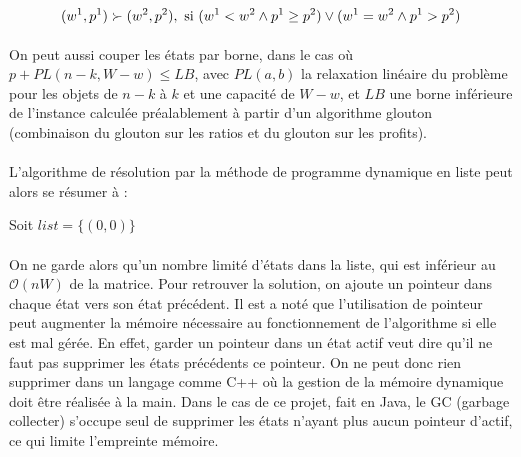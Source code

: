 \documentclass[12pt]{article}
\begin{document}
\[
(w^1,p^1)\succ(w^2,p^2), \textnormal{ si }
(w^1 < w^2 \wedge p^1 \geq p^2) \vee (w^1 = w^2 \wedge p^1 > p^2)
\]


\paragraph{}On peut aussi couper les états par borne, dans le cas où $p+PL(n-k,W-w) \leq LB$, avec $PL(a,b)$ la relaxation linéaire du problème pour les objets de $n-k$ à $k$ et une capacité de $W-w$, et $LB$ une borne inférieure de l'instance calculée préalablement à partir d'un algorithme glouton (combinaison du glouton sur les ratios et du glouton sur les profits).

\paragraph{}L'algorithme de résolution par la méthode de programme dynamique en liste peut alors se résumer à :

\begin{algorithm}[H]
	Soit $list=\lbrace (0,0)\rbrace $\\
\end{algorithm}

\paragraph{}On ne garde alors qu'un nombre limité d'états dans la liste, qui est inférieur au $\mathcal{O}(nW)$ de la matrice. Pour retrouver la solution, on ajoute un pointeur dans chaque état vers son état précédent. Il est a noté que l'utilisation de pointeur peut augmenter la mémoire nécessaire au fonctionnement de l'algorithme si elle est mal gérée. En effet, garder un pointeur dans un état actif veut dire qu'il ne faut pas supprimer les états précédents ce pointeur. On ne peut donc rien supprimer dans un langage comme C++ où la gestion de la mémoire dynamique doit être réalisée à la main. Dans le cas de ce projet, fait en Java, le GC (garbage collecter) s'occupe seul de supprimer les états n'ayant plus aucun pointeur d'actif, ce qui limite l'empreinte mémoire.
\end{document}
